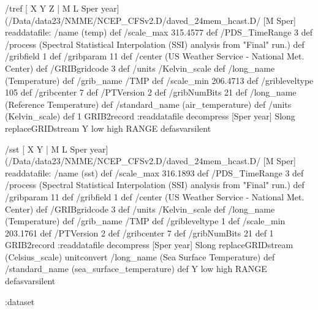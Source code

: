 \begin{ingrid}
 /tref{
[ X Y Z | M L Sper year] 
(/Data/data23/NMME/NCEP_CFSv2.D/daved_24mem_hcast.D/%
 [M Sper]
readdatafile:
/name (temp) def
 /scale_max 315.4577 def
 /PDS_TimeRange 3 def
 /process (Spectral Statistical Interpolation (SSI) analysis from "Final" run.) def
 /gribfield 1 def
 /gribparam 11 def
 /center (US Weather Service - National Met. Center) def
 /GRIBgridcode 3 def
 /units /Kelvin_scale def
 /long_name (Temperature) def
 /grib_name /TMP def
 /scale_min 206.4713 def
 /gribleveltype 105 def
 /gribcenter 7 def
 /PTVersion 2 def
 /gribNumBits 21 def
/long_name (Reference Temperature) def
/standard_name (air_temperature) def
/units (Kelvin_scale) def
 1 GRIB2record :readdatafile
decompress
[Sper year] Slong replaceGRIDstream
Y low high RANGE
}defasvarsilent
\end{ingrid}
\begin{ingrid}
 /sst{
[ X Y | M L Sper year] 
(/Data/data23/NMME/NCEP_CFSv2.D/daved_24mem_hcast.D/%
 [M Sper]
readdatafile:
/name (sst) def
 /scale_max 316.1893 def
 /PDS_TimeRange 3 def
 /process (Spectral Statistical Interpolation (SSI) analysis from "Final" run.) def
 /gribparam 11 def
 /gribfield 1 def
 /center (US Weather Service - National Met. Center) def
 /GRIBgridcode 3 def
 /units /Kelvin_scale def
 /long_name (Temperature) def
 /grib_name /TMP def
 /gribleveltype 1 def
 /scale_min 203.1761 def
 /PTVersion 2 def
 /gribcenter 7 def
 /gribNumBits 21 def
1 GRIB2record :readdatafile
decompress
[Sper year] Slong replaceGRIDstream
(Celsius_scale) unitconvert
/long_name (Sea Surface Temperature) def
/standard_name (sea_surface_temperature) def
Y low high RANGE
}defasvarsilent
\end{ingrid}
\begin{ingrid}
:dataset
\end{ingrid}
